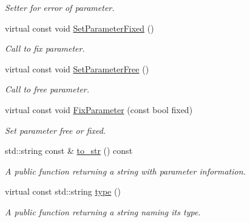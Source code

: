 \begin{DoxyCompactItemize}
\begin{DoxyCompactList}\small\item\em Setter for error of parameter. \end{DoxyCompactList}\item 
\hypertarget{class_bool_parameter_a651a5ed8154eed589c31b6c93e8538fc}{virtual const void \hyperlink{class_bool_parameter_a651a5ed8154eed589c31b6c93e8538fc}{Set\-Parameter\-Fixed} ()}\label{class_bool_parameter_a651a5ed8154eed589c31b6c93e8538fc}

\begin{DoxyCompactList}\small\item\em Call to fix parameter. \end{DoxyCompactList}\item 
\hypertarget{class_bool_parameter_a048483a4a765ad5b100a19b8d5f1ed49}{virtual const void \hyperlink{class_bool_parameter_a048483a4a765ad5b100a19b8d5f1ed49}{Set\-Parameter\-Free} ()}\label{class_bool_parameter_a048483a4a765ad5b100a19b8d5f1ed49}

\begin{DoxyCompactList}\small\item\em Call to free parameter. \end{DoxyCompactList}\item 
\hypertarget{class_bool_parameter_a827373e73426bc1df9e0504fd05452b6}{virtual const void \hyperlink{class_bool_parameter_a827373e73426bc1df9e0504fd05452b6}{Fix\-Parameter} (const bool fixed)}\label{class_bool_parameter_a827373e73426bc1df9e0504fd05452b6}

\begin{DoxyCompactList}\small\item\em Set parameter free or fixed. \end{DoxyCompactList}\item 
std\-::string const \& \hyperlink{class_bool_parameter_a251a49ae038463171f4d930d3a29a85e}{to\-\_\-str} () const 
\begin{DoxyCompactList}\small\item\em A public function returning a string with parameter information. \end{DoxyCompactList}\item 
virtual const std\-::string \hyperlink{class_bool_parameter_a6721b6ea49385a388b622afdf6b03d59}{type} ()
\begin{DoxyCompactList}\small\item\em A public function returning a string naming its type. \end{DoxyCompactList}\end{DoxyCompactItemize}
